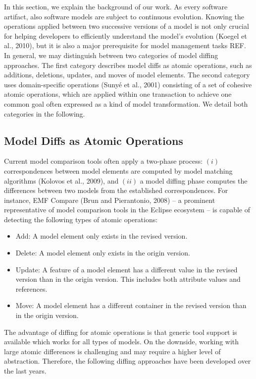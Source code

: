 In this section, we explain the background of our work. As every software artifact, also software models are subject to continuous evolution. Knowing the operations applied between two successive versions of a model is not only crucial for helping developers to efficiently understand the model's evolution (Koegel et al., 2010), but it is also a major prerequisite for model management tasks REF. In general, we may distinguish between two categories of model diffing approaches. The first category describes model diffs as atomic operations, such as additions, deletions, updates, and moves of model elements. The second category uses domain-specific operations (Sunyé et al., 2001) consisting of a set of cohesive atomic operations, which are applied within one transaction to achieve one common goal often expressed as a kind of model transformation. We detail both categories in the following.

\subsection{Model Diffs as Atomic Operations}

Current model comparison tools often apply a two-phase process: $(i)$ correspondences between model elements are computed by model matching algorithms (Kolovos et al., 2009), and $(ii)$ a model diffing phase computes the differences between two models from the established correspondences. For instance, EMF Compare (Brun and Pierantonio, 2008) – a prominent representative of model comparison tools in the Eclipse ecosystem – is capable of detecting the following types of atomic operations:

\begin{itemize}
  \item Add: A model element only exists in the revised version.
  \item Delete: A model element only exists in the origin version.
  \item Update: A feature of a model element has a different value in the revised version than in the origin version. This includes both attribute values and references.
  \item Move: A model element has a different container in the revised version than in the origin version.
\end{itemize}

The advantage of diffing for atomic operations is that generic tool support is available which works for all types of models. On the downside, working with large atomic differences is challenging and may require a higher level of abstraction. Therefore, the following diffing approaches have been developed over the last years. 


